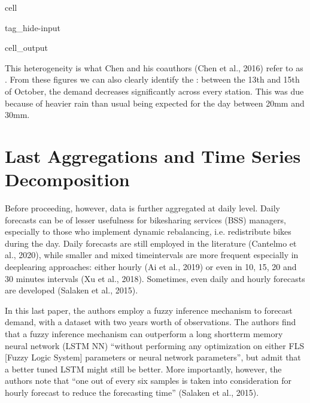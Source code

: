 \documentclass[letterpaper,10pt,english]{jupyterBook}
\begin{document}
\begin{sphinxuseclass}{cell}
\begin{sphinxuseclass}{tag_hide-input}
\begin{sphinxuseclass}{cell_output}
\noindent{}

\noindent{}

\end{sphinxuseclass}
\end{sphinxuseclass}
\end{sphinxuseclass}
\sphinxAtStartPar
This heterogeneity is what Chen and his coauthors (Chen et al., 2016) refer to as . From these figures we can also clearly identify the : between the 13th and 15th of October, the demand decreases significantly across every station. This was due because of heavier rain than usual being expected for the day \sphinxhyphen{} between 20mm and 30mm.


\section{Last Aggregations and Time Series Decomposition}
\label{\detokenize{05-time_series_analysis:last-aggregations-and-time-series-decomposition}}
\sphinxAtStartPar
Before proceeding, however, data is further aggregated at daily level. Daily forecasts can be of lesser usefulness for bike\sphinxhyphen{}sharing services (BSS) managers, especially to those who implement dynamic rebalancing, i.e. redistribute bikes during the day. Daily forecasts are still employed in the literature (Cantelmo et al., 2020), while smaller and mixed time\sphinxhyphen{}intervals are more frequent especially in deep\sphinxhyphen{}learing approaches: either hourly (Ai et al., 2019) or even in 10, 15, 20 and 30 minutes intervals (Xu et al., 2018). Sometimes, even daily and hourly forecasts are developed (Salaken et al., 2015).

\sphinxAtStartPar
In this last paper, the authors employ a fuzzy inference mechanism to forecast demand, with a dataset with two years worth of observations. The authors find that a fuzzy inference mechanism can outperform a long short\sphinxhyphen{}term memory neural network (LSTM NN) “without performing any optimization on either FLS {[}Fuzzy Logic System{]} parameters or neural network parameters”, but admit that a better tuned LSTM might still be better. More importantly, however, the authors note that “one out of every six samples is taken into consideration for hourly forecast to reduce the forecasting time” (Salaken et al., 2015).
\end{document}
